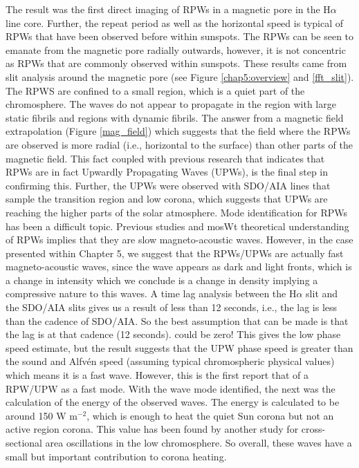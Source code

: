    
    The result was the first direct imaging of RPWs in a magnetic pore in the H$\alpha$ line core.
    Further, the repeat period as well as the horizontal speed is typical of RPWs that have been observed before within sunspots.
    The RPWs can be seen to emanate from the magnetic pore radially outwards, however, it is not concentric as RPWs that are commonly observed within sunspots.
    These results came from slit analysis around the magnetic pore (see Figure \ref{chap5:overview} and \ref{fft_slit}).
    The RPWS are confined to a small region, which is a quiet part of the chromosphere.
    The waves do not appear to propagate in the region with large static fibrils and regions with dynamic fibrils.
    The answer from a magnetic field extrapolation (Figure \ref{mag_field}) which suggests that the field where the RPWs are observed is more radial (i.e., horizontal to the surface) than other parts of the magnetic field.
    This fact coupled with previous research that indicates that RPWs are in fact Upwardly Propagating Waves (UPWs), is the final step in confirming this.     
    Further, the UPWs were observed with SDO/AIA lines that sample the transition region and low corona, which suggests that UPWs are reaching the higher parts of the solar atmosphere.
    Mode identification for RPWs has been a difficult topic. 
    Previous studies and mosWt theoretical understanding of RPWs implies that they are slow magneto-acoustic waves.
    However, in the case presented within Chapter 5, we suggest that the RPWs/UPWs are actually fast magneto-acoustic waves, since the wave appears as dark and light fronts, which is a change in intensity which we conclude is a change in density implying a compressive nature to this waves.
    A time lag analysis between the H$\alpha$ slit and the SDO/AIA slits gives us a result of less than 12 seconds, i.e., the lag is less than the cadence of SDO/AIA.
    So the best assumption that can be made is that the lag is at that cadence (12 seconds). could be zero!
    This gives the low phase speed estimate, but the result suggests that the UPW phase speed is greater than the sound and Alfv\'en speed (assuming typical chromospheric physical values) which means it is a fast wave. 
    However, this is the first report that of a RPW/UPW as a fast mode.
    With the wave mode identified, the next was the calculation of the energy of the observed waves.
    The energy is calculated to be around 150 W m$^{-2}$, which is enough to heat the quiet Sun corona but not an active region corona.
    This value has been found by another study for cross-sectional area oscillations in the low chromosphere.
    So overall, these waves have a small but important contribution to corona heating.
    
